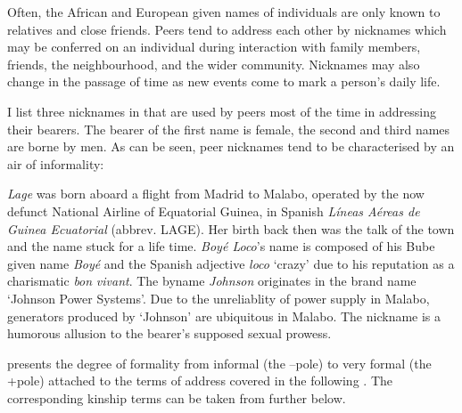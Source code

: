 Often, the African and European given names of individuals are only known to relatives and close friends. Peers tend to address each other by nicknames which may be conferred on an individual during interaction with family members, friends, the neighbourhood, and the wider community. Nicknames may also change in the passage of time as new events come to mark a person’s daily life. 


I list three nicknames in  that are used by peers most of the time in addressing their bearers. The bearer of the first name is female, the second and third names are borne by men. As can be seen, peer nicknames tend to be characterised by an air of informality:


\textit{Lage} was born aboard a flight from Madrid to Malabo, operated by the now defunct National Airline of Equatorial Guinea, in Spanish \textit{Líneas Aéreas de Guinea Ecuatorial} (abbrev. LAGE). Her birth back then was the talk of the town and the name stuck for a life time. \textit{Boyé Loco}’s name is composed of his Bube given name \textit{Boyé} and the Spanish adjective \textit{loco} ‘crazy’ due to his reputation as a charismatic \textit{bon} \textit{vivant}. The byname \textit{Johnson} originates in the brand name ‘Johnson Power Systems’. Due to the unreliablity of power supply in Malabo, generators produced by ‘Johnson’ are ubiquitous in Malabo. The nickname is a humorous allusion to the bearer’s supposed sexual prowess. 

 presents the degree of formality from informal (the –pole) to very formal (the +pole) attached to the terms of address covered in the following \citep[209]{Mühleisen2005}. The corresponding kinship terms can be taken from  further below.

